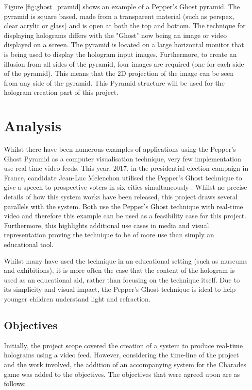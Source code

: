 Figure \ref{fig:ghost_pramid} shows an example of a Pepper's Ghost pyramid. The pyramid is square based, made from a transparent material (such as perspex, clear acrylic or glass) and is open at both the top and bottom. The technique for displaying holograms differs with the "Ghost" now being an image or video displayed on a screen. The pyramid is located on a large horizontal monitor that is being used to display the hologram input images. Furthermore, to create an illusion from all sides of the pyramid, four images are required (one for each side of the pyramid). This  means that the 2D projection of the image can be seen from any side of the pyramid. This Pyramid structure will be used for the hologram creation part of this project.

\section{Analysis}
Whilst there have been numerous examples of applications using the Pepper's Ghost Pyramid as a computer visualisation technique, very few implementation use real time video feeds. This year, 2017, in the presidential election campaign in France, candidate Jean-Luc Melenchon utilised the Pepper's Ghost technique to give a speech to prospective voters in six cities simultaneously \cite{french_elections}. Whilst no precise details of how this system works have been released, this project draws several parallels with the system. Both use the Pepper's Ghost technique with real-time video and therefore this example can be used as a feasibility case for this project. Furthermore, this highlights additional use cases in media and visual representation proving the technique to be of more use than simply an educational tool.

Whilst many have used the technique in an educational setting (such as museums and exhibitions), it is more often the case that the content of the hologram is used as an educational aid, rather than focusing on the technique itself. Due to its simplicity and visual impact, the Pepper's Ghost technique is ideal to help younger children understand light and refraction.  

\subsection{Objectives}
Initially, the project scope covered the creation of a system to produce real-time holograms using a video feed. However, considering the time-line of the project and the work involved, the addition of an accompanying system for the Charades game was added to the objectives. The objectives that were agreed upon are as follows:

